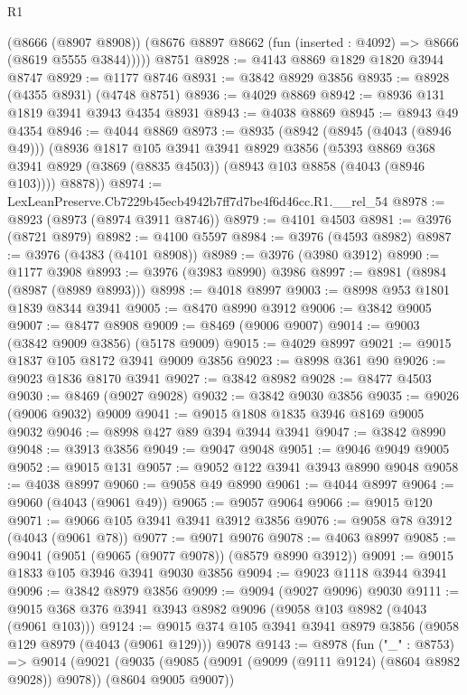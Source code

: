 \begin{lexlean}{R1}
\begin{coremodule}
        (@8666 (@8907 @8908))
        (@8676 @8897 @8662 (fun (inserted : @4092) => @8666 (@8619 @5555 @3844)))))
    @8751
@8928 := @4143 @8869 @1829 @1820 @3944 @8747
@8929 := @1177 @8746
@8931 := @3842 @8929 @3856
@8935 := @8928 (@4355 @8931) (@4748 @8751)
@8936 := @4029 @8869
@8942 := @8936 @131 @1819 @3941 @3943 @4354 @8931
@8943 := @4038 @8869
@8945 := @8943 @49 @4354
@8946 := @4044 @8869
@8973 := @8935
    (@8942
      (@8945 (@4043 (@8946 @49)))
      (@8936
        @1817
        @105
        @3941
        @3941
        @8929
        @3856
        (@5393 @8869 @368 @3941 @8929 (@3869 (@8835 @4503)) (@8943 @103 @8858 (@4043 (@8946 @103))))
        @8878))
@8974 := LexLeanPreserve.Cb7229b45ecb4942b7ff7d7be4f6d46cc.R1.__rel_54
@8978 := @8923 (@8973 (@8974 @3911 @8746))
@8979 := @4101 @4503
@8981 := @3976 (@8721 @8979)
@8982 := @4100 @5597
@8984 := @3976 (@4593 @8982)
@8987 := @3976 (@4383 (@4101 @8908))
@8989 := @3976 (@3980 @3912)
@8990 := @1177 @3908
@8993 := @3976 (@3983 @8990) @3986
@8997 := @8981 (@8984 (@8987 (@8989 @8993)))
@8998 := @4018 @8997
@9003 := @8998 @953 @1801 @1839 @8344 @3941
@9005 := @8470 @8990 @3912
@9006 := @3842 @9005
@9007 := @8477 @8908
@9009 := @8469 (@9006 @9007)
@9014 := @9003 (@3842 @9009 @3856) (@5178 @9009)
@9015 := @4029 @8997
@9021 := @9015 @1837 @105 @8172 @3941 @9009 @3856
@9023 := @8998 @361 @90
@9026 := @9023 @1836 @8170 @3941
@9027 := @3842 @8982
@9028 := @8477 @4503
@9030 := @8469 (@9027 @9028)
@9032 := @3842 @9030 @3856
@9035 := @9026 (@9006 @9032) @9009
@9041 := @9015 @1808 @1835 @3946 @8169 @9005 @9032
@9046 := @8998 @427 @89 @394 @3944 @3941
@9047 := @3842 @8990
@9048 := @3913 @3856
@9049 := @9047 @9048
@9051 := @9046 @9049 @9005
@9052 := @9015 @131
@9057 := @9052 @122 @3941 @3943 @8990 @9048
@9058 := @4038 @8997
@9060 := @9058 @49 @8990
@9061 := @4044 @8997
@9064 := @9060 (@4043 (@9061 @49))
@9065 := @9057 @9064
@9066 := @9015 @120
@9071 := @9066 @105 @3941 @3941 @3912 @3856
@9076 := @9058 @78 @3912 (@4043 (@9061 @78))
@9077 := @9071 @9076
@9078 := @4063 @8997
@9085 := @9041 (@9051 (@9065 (@9077 @9078)) (@8579 @8990 @3912))
@9091 := @9015 @1833 @105 @3946 @3941 @9030 @3856
@9094 := @9023 @1118 @3944 @3941
@9096 := @3842 @8979 @3856
@9099 := @9094 (@9027 @9096) @9030
@9111 := @9015 @368 @376 @3941 @3943 @8982 @9096 (@9058 @103 @8982 (@4043 (@9061 @103)))
@9124 := @9015 @374 @105 @3941 @3941 @8979 @3856 (@9058 @129 @8979 (@4043 (@9061 @129))) @9078
@9143 := @8978
    (fun ("_" : @8753) =>
    @9014
      (@9021
        (@9035 (@9085 (@9091 (@9099 (@9111 @9124) (@8604 @8982 @9028)) @9078)) (@8604 @9005 @9007))

\end{coremodule}
\end{lexlean}

